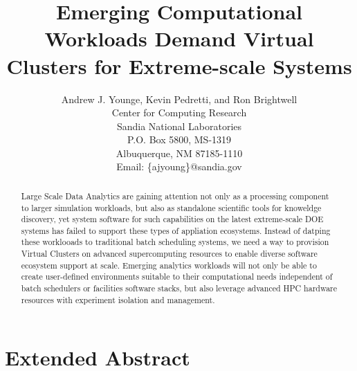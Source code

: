 
\newcommand{\AJY}[1]{{\color{red}\em  AJY: #1}}
\newcommand{\TODO}[1]{{\color{green}\em  TODO: #1}}
\newcommand{\E}[1]{{\color{red}~\blacksquare~\footnote{grammar, spelling, sentence, or other error}~}}

\newcommand{\AUTHOR}{%
Andrew J. Younge, Kevin Pedretti, and Ron Brightwell\\
Center for Computing Research \\
Sandia National Laboratories \\
P.O. Box 5800, MS-1319 \\
Albuquerque, NM 87185-1110 \\
Email: \{ajyoung\}@sandia.gov%
}

\newcommand{\TITLE}{Emerging Computational Workloads Demand Virtual Clusters for Extreme-scale Systems}


\title{\TITLE}
\author{\AUTHOR}

\maketitle

\begin{abstract}
Large Scale Data Analytics are gaining attention not only as a processing component to larger simulation workloads, but also as standalone scientific tools for knoweldge discovery, yet system software for such capabilities on the latest extreme-scale DOE systems has failed to support these types of appliation ecosystems.  Instead of datping these worklooads to traditional batch scheduling systems, we need a way to provision Virtual Clusters on advanced supercomputing resources to enable diverse software ecosystem support at scale. Emerging analytics workloads will not only be able to create user-defined environments suitable to their computational needs independent of batch schedulers or facilities software stacks, but also leverage advanced HPC hardware resources with experiment isolation and management. 

\end{abstract}

\section{Extended Abstract}

